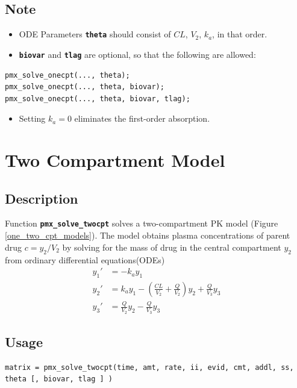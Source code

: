 \documentclass[10pt, reqno, oneside]{amsbook}
\numberwithin{equation}{chapter}
\numberwithin{figure}{chapter}
\numberwithin{table}{chapter}
\theoremstyle{remark}
\begin{document}
\subsection{Note}
\label{sec:orgeaaed49}
\begin{itemize}
\item ODE Parameters {\small \color{MRGGreen} \texttt{\textbf{theta}}} should consist of \(CL\), \(V_2\), \(k_a\), in that order.
\item {\small \color{MRGGreen} \texttt{\textbf{biovar}}} and {\small \color{MRGGreen} \texttt{\textbf{tlag}}} are optional, so that the following are allowed:
\end{itemize}
\begin{verbatim}
pmx_solve_onecpt(..., theta);
pmx_solve_onecpt(..., theta, biovar);
pmx_solve_onecpt(..., theta, biovar, tlag);
\end{verbatim}
\begin{itemize}
\item Setting \(k_a = 0\) eliminates the first-order absorption.
\end{itemize}

\section{Two Compartment Model}
\label{sec:org57c7047}
\label{sec:twocpt}
\subsection{Description}
\label{sec:org1f96c2d}
Function {\small \color{MRGGreen} \texttt{\textbf{pmx\_solve\_twocpt}}} solves a two-compartment PK
model (Figure \ref{one_two_cpt_models}). The model obtains plasma concentrations of parent drug \(c=y_2/V_2\)
by solving for the mass of drug in the central compartment
\(y_2\) from ordinary differential equations(ODEs)
\begin{subequations}
  \begin{align} \label{eq:twocpt}
    y_1' &= -k_a y_1 \\
    y_2' &= k_a y_1 - \left(\frac{CL}{V_2} + \frac{Q}{V_2}\right) y_2 +  \frac{Q}{V_3}  y_3  \\ 
    y_3' &= \frac{Q}{V_2} y_2 - \frac{Q}{V_3} y_3
  \end{align}
\end{subequations}

\subsection{Usage}
\label{sec:org99b81c8}
\begin{verbatim}
matrix = pmx_solve_twocpt(time, amt, rate, ii, evid, cmt, addl, ss, theta [, biovar, tlag ] )
\end{verbatim}
\end{document}
